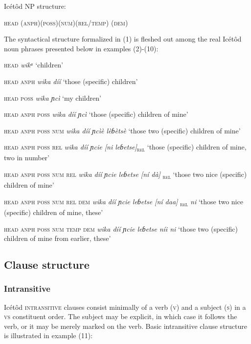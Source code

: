 Icétôd NP structure: 

\textsc{head (anph)(poss)(num)(rel/temp) (dem)}


The syntactical structure formalized in (1) is fleshed out among the real Icétôd noun phrases presented below in examples (2)-(10):



\textsc{head}
\textit{wikᵃ}
‘children’




\textsc{head anph}
\textit{wika díí}
‘those (specific) children’




\textsc{head poss}
\textit{wika ɲcì}
‘my children’




\textsc{head anph poss}
\textit{wika díí ɲcì}
‘those (specific) children of mine’




\textsc{head anph poss num}
\textit{wika díí ɲcìè lèɓètsè}
‘those two (specific) children of mine’




\textsc{head anph poss rel}
\textit{wika díí ɲcie [ni leɓetse]}\textsc{\textsubscript{rel}} 
‘those (specific) children of mine, two in number’




\textsc{head anph poss num rel}
\textit{wika díí ɲcie leɓetse [ní dà]}\textsc{\textsubscript{ rel}}
‘those two nice (specific) children of mine’




\textsc{head anph poss num rel dem}
\textit{wika díí ɲcie leɓetse [ní daa]}\textsc{\textsubscript{ rel}}\textit{ ni}
‘those two nice (specific) children of mine, these’




\textsc{head anph poss num temp dem}
\textit{wika díí ɲcie leɓetse níi ni}
‘those two (specific) children of mine from earlier, these’






\subsection{Clause structure}
\subsubsection{Intransitive}

Icétôd \textsc{intransitive} clauses consist minimally of a verb (\textsc{v}) and a subject (\textsc{s}) in a \textsc{vs} constituent order. The subject may be explicit, in which case it follows the verb, or it may be merely marked on the verb. Basic intransitive clause structure is illustrated in example (11):




